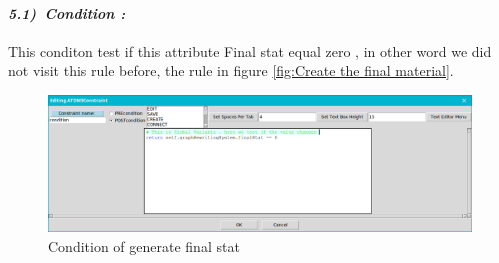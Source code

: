 \paragraph{\emph{5.1)~Condition : } } 
This conditon test if this attribute Final stat equal zero 
, in other word we did not visit this rule before, the rule in figure  \ref{fig:Create the final material}.
 \vspace{1cm} 
\begin{figure}[th]
	\centering
 	\includegraphics[scale=0.37]{ch3/img/condfinal}
	\caption{\label{fig:Condition of generate final stat } Condition of generate final stat }
\end{figure} 

